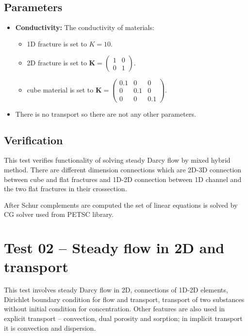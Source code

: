 \subsection*{Parameters}
\begin{itemize}
  \item \textbf{Conductivity:} The conductivity of materials:
    \begin{itemize}
      \item 1D fracture is set to $K=10$.
      \item 2D fracture is set to $\mathbf{K}=\left(\begin{array}{cc} 1 & 0 \\ 0 & 1\end{array} \right)$.
      \item cube material is set to $\mathbf{K}=\left(\begin{array}{ccc} 0.1 & 0 & 0 \\ 0 & 0.1 & 0 \\ 0 & 0 & 0.1\end{array} \right)$.
    \end{itemize}
  \item There is no transport so there are not any other parameters.
\end{itemize}

\subsection*{Verification}
This test verifies functionality of solving steady Darcy flow by mixed hybrid method. There are different dimension connections which are 2D-3D connection between cube and flat fractures and 1D-2D connection between 1D channel and the two flat fractures in their crossection.

After Schur complements are computed the set of linear equations is solved by CG solver used from PETSC library.






\section{Test 02 -- Steady flow in 2D and transport}
This test involves steady Darcy flow in 2D, connections of 1D-2D elements, Dirichlet boundary condition for flow and transport, transport of two substances without initial condition for concentration. Other features are also used in explicit transport -- convection, dual porosity and sorption; in implicit transport it is convection and dispersion.

